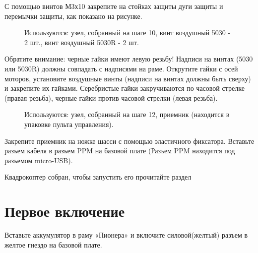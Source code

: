 \documentclass[a4paper,10pt,russian]{sphinxmanual}
\begin{document}
С помощью винтов М3х10 закрепите на стойках защиты дуги защиты и перемычки защиты, как показано на рисунке.


\begin{figure}[H]
\centering
\capstart

\noindent{}
\caption{Используются: узел, собранный на шаге 10, винт воздушный 5030 - 2 шт., винт воздушный 5030R - 2 шт.}\label{\detokenize{const/const_protection:id5}}\end{figure}

Обратите внимание: черные гайки имеют левую резьбу! Надписи на винтах (5030 или 5030R) должны совпадать с надписями на раме.
Открутите гайки с осей моторов, установите воздушные винты (надписи на винтах должны быть сверху) и закрепите их гайками. Серебристые гайки закручиваются по часовой стрелке (правая резьба), черные гайки \textendash{} против часовой стрелки (левая резьба).


\begin{figure}[H]
\centering
\capstart

\noindent{}
\caption{Используются: узел, собранный на шаге 12, приемник (находится в упаковке пульта управления).}\label{\detokenize{const/const_protection:id6}}\end{figure}

Закрепите приемник на ножке шасси с помощью эластичного фиксатора. Вставьте разъем кабеля в разъем PPM на базовой плате (Разъем PPM находится под разъемом micro-USB).

Квадрокоптер собран, чтобы запустить его прочитайте раздел {\hyperref[\detokenize{const/const_switch_on::doc}]{}}


\section{Первое включение}
\label{\detokenize{const/const_switch_on:id1}}\label{\detokenize{const/const_switch_on::doc}}
Вставьте аккумулятор в раму «Пионера» и включите силовой(желтый) разъем в желтое гнездо на базовой плате.

\end{document}
